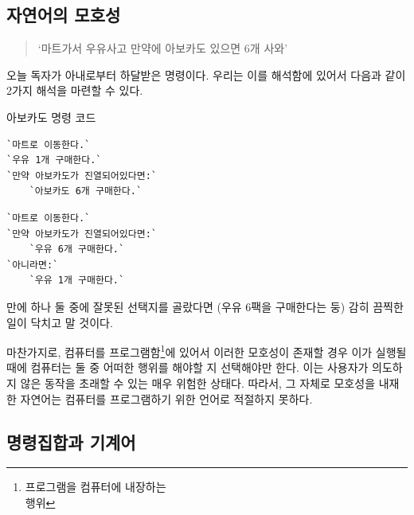 \documentclass{article}
\begin{document}
\subsection{자연어의 모호성}

\begin{quote}
`마트가서 우유사고 만약에 아보카도 있으면 6개 사와'
\end{quote}

오늘 독자가 아내로부터 하달받은 명령이다.
우리는 이를 해석함에 있어서 다음과 같이 2가지 해석을 마련할 수 있다.

\begin{center}

    \centering

    아보카도 명령 코드

    \begin{minipage}{0.45\textwidth}
        \begin{lstlisting}[escapeinside=``]
`마트로 이동한다.`
`우유 1개 구매한다.`
`만약 아보카도가 진열되어있다면:`
    `아보카도 6개 구매한다.`
        \end{lstlisting}
    \end{minipage}
    \hfill
    \begin{minipage}{0.45\textwidth}
        \begin{lstlisting}[escapeinside=``]
`마트로 이동한다.`
`만약 아보카도가 진열되어있다면:`
    `우유 6개 구매한다.`
`아니라면:`
    `우유 1개 구매한다.`
        \end{lstlisting}
    \end{minipage}

\end{center}

만에 하나 둘 중에 잘못된 선택지를 골랐다면 (우유 6팩을 구매한다는 둥)
감히 끔찍한 일이 닥치고 말 것이다.

마찬가지로, 컴퓨터를 프로그램함\footnote{프로그램을 컴퓨터에 내장하는 \\
행위}에 있어서 이러한 모호성이 존재할 경우 이가 실행될 때에 컴퓨터는 둘
중 어떠한 행위를 해야할 지 선택해야만 한다. 이는 사용자가 의도하지 않은
동작을 초래할 수 있는 매우 위험한 상태다. 따라서, 그 자체로 모호성을
내재한 자연어는 컴퓨터를 프로그램하기 위한 언어로 적절하지 못하다.

\subsection{명령집합과 기계어}
\end{document}
